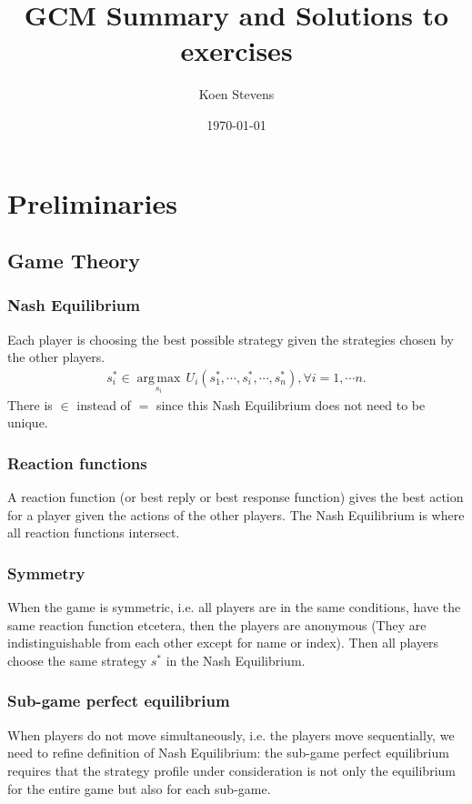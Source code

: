 \documentclass[11pt]{article}
\title{GCM Summary and Solutions to exercises}
\author{Koen Stevens}
\date{\today}
\numberwithin{equation}{section}
\DeclareMathOperator*{\argmax}{arg\,max}
\newcommand{\1}[1]{\,I_{#1}} %
\begin{document}
\maketitle
\tableofcontents
\section{Preliminaries}
\subsection{Game Theory}
\subsubsection{Nash Equilibrium}
Each player is choosing the best possible strategy given the strategies chosen by the other players.
\begin{align}
	s^*_i\in \underset{s_i}{\argmax}\,U_i(s^*_1,\cdots,s^*_i,\cdots,s_n^*),\forall i=1,\cdots n.
\end{align}
There is $\in$ instead of $=$ since this Nash Equilibrium does not need to be unique.
\subsubsection{Reaction functions}
A reaction function (or best reply or best response function) gives the best action for a player
given the actions of the other players. The Nash Equilibrium is where all reaction functions intersect.
\subsubsection{Symmetry}
When the game is symmetric, i.e. all players are in the same conditions, have the same reaction function
etcetera, then the players are anonymous (They are indistinguishable from each other except for
name or index). Then all players choose the same strategy $s^*$ in the Nash Equilibrium.
\subsubsection{Sub-game perfect equilibrium}
When players do not move simultaneously, i.e. the players move sequentially, we need to refine
definition of Nash Equilibrium: the sub-game perfect equilibrium requires that the strategy profile
under consideration is not only the equilibrium for the entire game but also for each sub-game.
\end{document}
